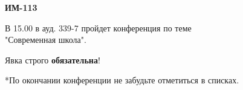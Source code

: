 \documentclass{article}
\begin{document}
\thispagestyle{empty}
\centering
\huge{}
\textbf{ИМ-113}
\normalsize

\vspace{1.5cm}
В 15.00 в ауд. 339-7 пройдет конференция по теме\\ "Современная школа".

Явка строго \textbf{обязательна}!

\vspace{1.5cm}
\scriptsize{*По окончании конференции не забудьте отметиться в списках.}
\end{document}
